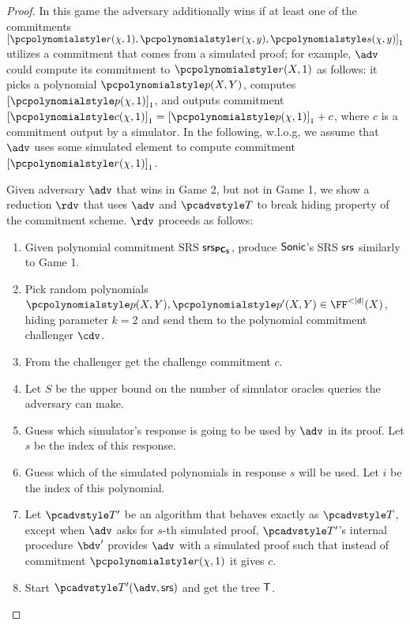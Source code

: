 \documentclass[runningheads,11pt]{llncs}
\begin{document}
\begin{proof}
   In this game the adversary additionally wins if at least one of
  the commitments $\gone{\p{r} (\chi, 1), \p{r} (\chi, y), \p{s} (\chi, y)}$
  utilizes a commitment that comes from a simulated proof; for example, $\adv$
  could compute its commitment to $\p{r} (X, 1)$ as follows: it picks a
  polynomial $\p{p} (X, Y)$, computes $\gone{\p{p} (\chi, 1)}$, and outputs
  commitment $\gone{\p{c} (\chi, 1)} = \gone{\p{p} (\chi, 1)} + c$, where $c$ is
  a commitment output by a simulator. In the following, w.l.o.g, we assume that
  $\adv$ uses some simulated element to compute commitment
  $\gone{\p{r} (\chi, 1)}$.

   Given adversary $\adv$ that wins in Game 2, but not
  in Game 1, we show a reduction $\rdv$ that uses $\adv$ and $\tdv$ to break
  hiding property of the commitment scheme. $\rdv$ proceeds as follows:
  \begin{enumerate}
  \item Given polynomial commitment SRS $\mathsf{srs}_{\bm{\mathsf{PC}}_{\bm{\mathsf{S}}}}$, produce ${\textnormal{\textsf{Sonic}}}$'s SRS
    $\mathsf{srs}$ similarly to Game 1. 
  \item Pick random polynomials
    $\p{p} (X, Y), \p{p'} (X, Y) \in \FF^{< |\dconst|} (X)$, hiding parameter
    $k = 2$ and send them to the polynomial commitment challenger $\cdv$.
  \item From the challenger get the challenge commitment $c$.
  \item Let $S$ be the upper bound on the number of simulator oracles queries
    the adversary can make. 
  \item Guess which simulator's response is going to be used by $\adv$ in its
    proof. Let $s$ be the index of this response.
  \item Guess which of the simulated polynomials in response $s$ will be
    used. Let $i$ be the index of this polynomial.
  \item Let $\tdv'$ be an algorithm that behaves exactly as $\tdv$, except when
    $\adv$ asks for $s$-th simulated proof, $\tdv'$'s internal procedure $\bdv'$
    provides $\adv$ with a simulated proof such that instead of commitment
    $\p{r} (\chi, 1)$ it gives $c$. 
  \item Start $\tdv'(\adv, \srs)$ and get the tree $\mathsf{T}$.

\end{enumerate}
\end{proof}
\end{document}
